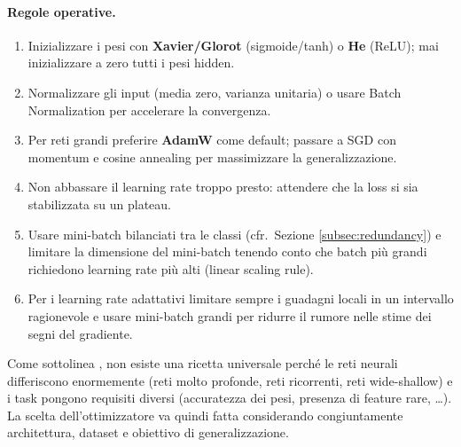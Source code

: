 \paragraph{Regole operative.}
\begin{enumerate}
  \item Inizializzare i pesi con \textbf{Xavier/Glorot} (sigmoide/tanh) o
        \textbf{He} (ReLU); mai inizializzare a zero tutti i pesi hidden.
  \item Normalizzare gli input (media zero, varianza unitaria) o usare Batch
        Normalization per accelerare la convergenza.
  \item Per reti grandi preferire \textbf{AdamW} come default; passare a SGD
        con momentum e cosine annealing per massimizzare la generalizzazione.
  \item Non abbassare il learning rate troppo presto: attendere che la loss si
        sia stabilizzata su un plateau.
  \item Usare mini-batch bilanciati tra le classi (cfr.\ Sezione
        \ref{subsec:redundancy}) e limitare la dimensione del mini-batch
        tenendo conto che batch più grandi richiedono learning rate più alti
        (linear scaling rule).
  \item Per i learning rate adattativi limitare sempre i guadagni locali in un
        intervallo ragionevole e usare mini-batch grandi per ridurre il rumore
        nelle stime dei segni del gradiente.
\end{enumerate}

Come sottolinea \citet{bishop2024}, non esiste una ricetta universale perché le
reti neurali differiscono enormemente (reti molto profonde, reti ricorrenti,
reti wide-shallow) e i task pongono requisiti diversi (accuratezza dei pesi,
presenza di feature rare, …). La scelta dell'ottimizzatore va quindi fatta
considerando congiuntamente architettura, dataset e obiettivo di generalizzazione.

